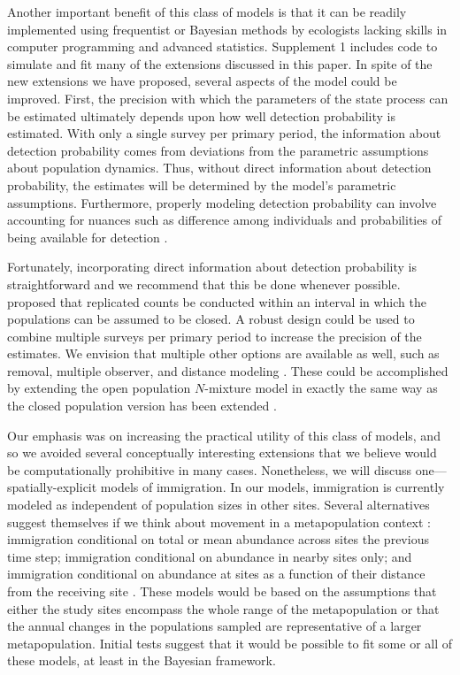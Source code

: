 \documentclass[12pt,english]{article}
\begin{document}
\begin{spacing}{1.9}
\begin{flushleft}
Another important benefit of this class of models is that it can be
readily implemented using frequentist or Bayesian methods by
ecologists lacking skills in computer programming and advanced
statistics. Supplement 1 includes code to
simulate and fit many of the extensions discussed in this paper.
In spite of the new extensions we have proposed, several aspects of
the model could be improved. First, the precision with which the
parameters of the state process can be estimated ultimately depends
upon how well detection probability is estimated. With
only a single survey per primary period, the information about
detection probability comes from deviations from the parametric
assumptions about population dynamics. Thus, without direct information
about detection probability, the estimates will be determined by the
model's parametric assumptions. Furthermore, properly modeling detection
probability can involve accounting for nuances such as difference
among individuals and probabilities of being available for detection
\citep{nichols_etal:2009}.

Fortunately, incorporating direct information about detection probability 
is straightforward and we recommend that this be done whenever
possible. \citet{dail_madsen:2011} proposed that
replicated counts be conducted within an interval in which the populations can 
be assumed to be closed. A robust design \citep{pollock:1982} could be 
used to combine multiple surveys per
primary period to increase the precision of the estimates. We envision
that multiple other options are available as well, such as removal,
multiple observer, and distance modeling \citep{williams_etal:2002}. These could be
accomplished by extending the open population $N$-mixture model
in exactly the same way as the closed population version has been
extended \citep[e.g.,][]{royle_etal:2004}.

Our emphasis was on increasing the practical utility of this
class of models, and so we avoided several conceptually interesting
extensions that we believe would be computationally prohibitive in many
cases. Nonetheless, we will discuss one---spatially-explicit models of
immigration. 
In our models, immigration is currently modeled as independent of
population sizes in other sites. Several alternatives suggest
themselves if we think about movement in a metapopulation
context \citep{hanski:1998}: immigration conditional on total or mean
abundance across sites the previous time step; immigration
conditional on abundance in nearby sites only; and immigration
conditional on abundance at sites as a function of their distance
from the receiving site \citep{hastings:1991,hanski:1998}. These models would
be based on the assumptions that either the study sites
encompass the whole range of the metapopulation or that the
annual changes in the populations sampled are representative of
a larger metapopulation. Initial tests suggest that it would be
possible to fit some or all of these models, at least in the
Bayesian framework.


\end{flushleft}
\end{spacing}
\end{document}
